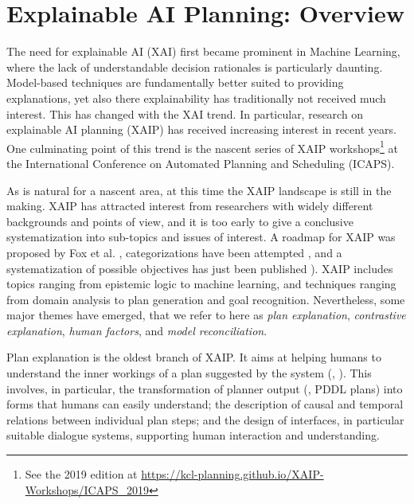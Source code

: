 \section{Explainable AI Planning: Overview}
\label{xaip}


The need for explainable AI (XAI) first became prominent in Machine
Learning, where the lack of understandable decision rationales is
particularly daunting. Model-based techniques are fundamentally better
suited to providing explanations, yet also there explainability has
traditionally not received much interest. This has changed with the
XAI trend. In particular, research on explainable AI planning (XAIP)
has received increasing interest in recent years. One culminating
point of this trend is the nascent series of XAIP
workshops\footnote{See the 2019 edition at
  \url{https://kcl-planning.github.io/XAIP-Workshops/ICAPS_2019}} at
the International Conference on Automated Planning and Scheduling
(ICAPS).

As is natural for a nascent area, at this time the XAIP landscape is
still in the making. XAIP has attracted interest from researchers with
widely different backgrounds and points of view, and it is too early
to give a conclusive systematization into sub-topics and issues of
interest.
A roadmap for XAIP was proposed by Fox et al. \cite{fox:etal:ijcai-ws-17}, categorizations have been attempted
\cite{langley:etal:aaai-17}, and a systematization of possible
objectives has just been published \cite{chakraborti:icaps-19}). XAIP
includes topics ranging from epistemic logic to machine learning, and
techniques ranging from domain analysis to plan generation and goal
recognition. Nevertheless, some major themes have emerged, that we
refer to here as \emph{plan explanation}, \emph{contrastive
  explanation}, \emph{human factors}, and \emph{model reconciliation}.

Plan explanation is the oldest branch of XAIP. It aims at helping
humans to understand the inner workings of a plan suggested by the
system (\eg,
\cite{mcguiness:etal:flairs-07,khan:etal:icaps-09,bidot:etal:mkwi-10,sohrabi:etal:aaai-11,seegebarth:etal:icaps-12,bercher:etal:icaps-14,nothdurft:etal:sigdal-15}). This
involves, in particular, the transformation of planner output (\eg,
PDDL plans) into forms that humans can easily understand; the
description of causal and temporal relations between individual plan
steps; and the design of interfaces, in particular suitable dialogue
systems, supporting human interaction and understanding.

